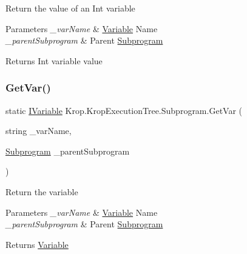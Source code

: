 Return the value of an Int variable 


\begin{DoxyParams}{Parameters}
{\em \+\_\+var\+Name} & \mbox{\hyperlink{namespace_krop_1_1_krop_execution_tree_1_1_variable}{Variable}} Name\\
\hline
{\em \+\_\+parent\+Subprogram} & Parent \mbox{\hyperlink{class_krop_1_1_krop_execution_tree_1_1_subprogram}{Subprogram}}\\
\hline
\end{DoxyParams}
\begin{DoxyReturn}{Returns}
Int variable value
\end{DoxyReturn}
\mbox{\label{class_krop_1_1_krop_execution_tree_1_1_subprogram_a51c0e1153e77771a566d7b6a96d0f26e}} 
\subsubsection{\texorpdfstring{Get\+Var()}{GetVar()}}
{\footnotesize\ttfamily static \mbox{\hyperlink{interface_krop_1_1_krop_execution_tree_1_1_interface_1_1_i_variable}{I\+Variable}} Krop.\+Krop\+Execution\+Tree.\+Subprogram.\+Get\+Var (\begin{DoxyParamCaption}\item[{string}]{\+\_\+var\+Name,  }\item[{\mbox{\hyperlink{class_krop_1_1_krop_execution_tree_1_1_subprogram}{Subprogram}}}]{\+\_\+parent\+Subprogram }\end{DoxyParamCaption})\hspace{0.3cm}{\ttfamily [static]}}



Return the variable 


\begin{DoxyParams}{Parameters}
{\em \+\_\+var\+Name} & \mbox{\hyperlink{namespace_krop_1_1_krop_execution_tree_1_1_variable}{Variable}} Name\\
\hline
{\em \+\_\+parent\+Subprogram} & Parent \mbox{\hyperlink{class_krop_1_1_krop_execution_tree_1_1_subprogram}{Subprogram}}\\
\hline
\end{DoxyParams}
\begin{DoxyReturn}{Returns}
\mbox{\hyperlink{namespace_krop_1_1_krop_execution_tree_1_1_variable}{Variable}}
\end{DoxyReturn}
\mbox{\label{class_krop_1_1_krop_execution_tree_1_1_subprogram_a3626c09fb9bf11430e8541e2c9740d81}} 
